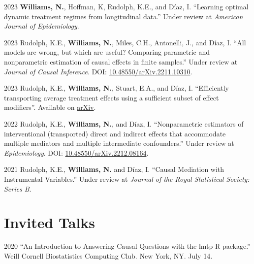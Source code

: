 \documentclass[12pt,letterpaper]{report}
\begin{document}
    \begin{tablist}
    
    	\item[2023] \tab \textbf{Williams, N.}, Hoffman, K, Rudolph, K.E., and Díaz, I. \enquote{Learning optimal dynamic treatment regimes from longitudinal data.} Under review at \textit{American Journal of Epidemiology}.
    
        \item[2023] \tab Rudolph, K.E., \textbf{Williams, N.}, Miles, C.H., Antonelli, J., and Díaz, I. \enquote{All models are wrong, but which are useful? Comparing parametric and nonparametric estimation of causal effects in finite samples.} Under review at \textit{Journal of Causal Inference}. DOI: \href{https://doi.org/10.48550/arXiv.2211.10310}{10.48550/arXiv.2211.10310}.
    
    \item[2023] \tab Rudolph, K.E., \textbf{Williams, N.}, Stuart, E.A., and Díaz, I. \enquote{Efficiently transporting average treatment effects using a sufficient subset of effect modifiers}. Available on \href{https://arxiv.org/abs/2304.00117}{arXiv}.
    
    \item[2022] \tab Rudolph, K.E., \textbf{Williams, N.}, and Díaz, I. \enquote{Nonparametric estimators of interventional (transported) direct and indirect effects that accommodate multiple mediators and multiple intermediate confounders.} Under review at \textit{Epidemiology}. DOI: \href{https://doi.org/10.48550/arXiv.2212.08164}{10.48550/arXiv.2212.08164}.
    
    \item[2021] \tab Rudolph, K.E., \textbf{Williams, N.} and Díaz, I. \enquote{Causal Mediation with Instrumental Variables.} Under review at \textit{Journal of the Royal Statistical Society: Series B}.
    
    \end{tablist}

    \section*{Invited Talks}

    \begin{tablist}

        \item[2020] \tab \enquote{An Introduction to Answering Causal Questions with the lmtp R package.} Weill Cornell Biostatistics Computing Club. New York, NY. July 14.

    \end{tablist}
    
\end{document}
